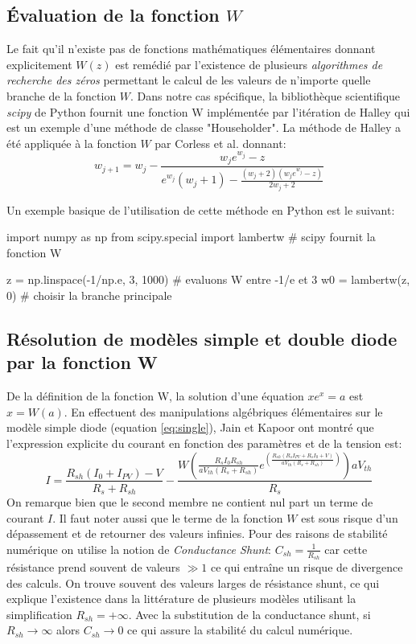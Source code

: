 \subsection{Évaluation de la fonction $W$}

Le fait qu'il n'existe pas de fonctions mathématiques élémentaires donnant explicitement $W(z)$ est remédié par l'existence de plusieurs \textit{algorithmes de recherche des zéros} permettant le calcul de les valeurs de n'importe quelle branche de la fonction $W$. Dans notre cas spécifique, la bibliothèque scientifique \textit{scipy} de Python fournit une fonction W implémentée par l'itération de Halley qui est un exemple d'une méthode de classe "Householder". La méthode de Halley a été appliquée à la fonction $W$  par Corless et al. \cite{Corless1996} donnant:
\begin{equation}
  \label{eq:halley}
  w_{j+1} = w_j - \frac{w_j e^{w_j} - z}{e^{w_j}(w_j + 1) - \frac{(w_j + 2)(w_j e^{w_j} - z)}{2w_j + 2}}
\end{equation}

Un exemple basique de l'utilisation de cette méthode en Python est le suivant:

\begin{python}[basicstyle=\tiny]
import numpy as np 
from scipy.special import lambertw # scipy fournit la fonction W

z = np.linspace(-1/np.e, 3, 1000) # evaluons W entre -1/e et 3
w0 = lambertw(z, 0) # choisir la branche principale
\end{python}

\subsection{Résolution de modèles simple et double diode par la fonction W}
De la définition de la fonction W, la solution d'une équation $xe^x = a$ est $x = W(a)$. En effectuent des manipulations algébriques élémentaires sur le modèle simple diode (equation \ref{eq:single}), Jain et Kapoor ont montré que l'expression explicite du courant en fonction des paramètres et de la tension est:
\begin{equation}
  \label{eq:lambertwsingle}
  I = \frac{R_{sh}(I_0 + I_{PV}) - V}{R_s + R_{sh}} - \frac{W\left(\frac{R_s I_0 R_{sh}}{a V_{th}(R_s + R_{sh})}e^{\left(\frac{R_{sh}(R_s I_{PV} + R_s I_0 + V)}{a V_{th} (R_s + R_{sh})}\right)}\right)aV_{th}}{R_s}
\end{equation}
On remarque bien que le second membre ne contient nul part un terme de courant $I$. Il faut noter aussi que le terme de la fonction $W$ est sous risque d'un dépassement et de retourner des valeurs infinies. Pour des raisons de stabilité numérique on utilise la notion de \textit{Conductance Shunt}: $C_{sh} = \frac{1}{R_{sh}}$ car cette résistance prend souvent de valeurs $\gg 1$ ce qui entraîne un risque de divergence des calculs. On trouve souvent des valeurs larges de résistance shunt, ce qui explique l'existence dans la littérature de plusieurs modèles utilisant la simplification $R_{sh} = + \infty$. Avec la substitution de la conductance shunt, si $R_{sh}\rightarrow\infty$ alors $C_{sh} \rightarrow 0$ ce qui assure la stabilité du calcul numérique.

